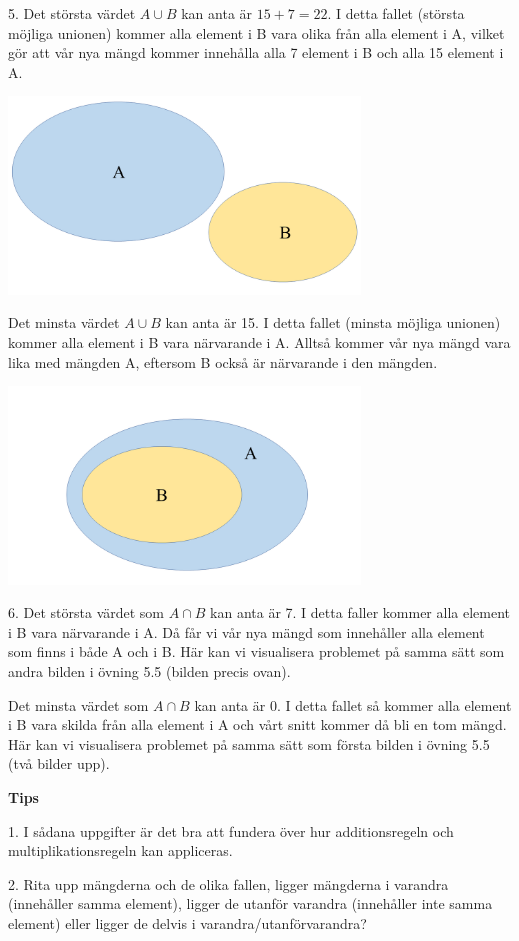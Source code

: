 \documentclass{tufte-handout}
\begin{document}
\begin{xca}
 5. Det största värdet $A \cup B$ kan anta är $15+7=22$. I detta fallet (största möjliga unionen) kommer alla element i B vara olika från alla element i A, vilket gör att vår nya mängd kommer innehålla alla 7 element i B och alla 15 element i A. 
 \begin{center}
    \includegraphics[width=0.7\textwidth]{graphics/mangButanformangdA.png}
 \end{center}
 
 Det minsta värdet $A \cup B$ kan anta är 15. I detta fallet (minsta möjliga unionen) kommer alla element i B vara närvarande i A. Alltså kommer vår nya mängd vara lika med mängden A, eftersom B också är närvarande i den mängden. 
 \begin{center}
    \includegraphics[width=0.7\textwidth]{graphics/mangimangdA.png}
 \end{center}

 6. Det största värdet som $A \cap B$ kan anta är 7. I detta faller kommer alla element i B vara närvarande i A. Då får vi vår nya mängd som innehåller alla element som finns i både A och i B. 
 Här kan vi visualisera problemet på samma sätt som andra bilden i övning 5.5 (bilden precis ovan).

 Det minsta värdet som $A \cap B$ kan anta är 0. I detta fallet så kommer alla element i B vara skilda från alla element i A och vårt snitt kommer då bli en tom mängd. 
 Här kan vi visualisera problemet på samma sätt som första bilden i övning 5.5 (två bilder upp).

\noindent\textbf{Tips}

1. I sådana uppgifter är det bra att fundera över hur additionsregeln och multiplikationsregeln kan appliceras. 

2. Rita upp mängderna och de olika fallen, ligger mängderna i varandra (innehåller samma element), ligger de utanför varandra (innehåller inte samma element) eller ligger de delvis i varandra/utanförvarandra?

\end{xca}
\end{document}
